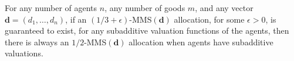 \begin{corollary}
    For any number of agents $n$, any number of goods $m$, and any vector $\boldsymbol{d}=(d_1,\ldots, d_n)$, if an $(1/3+\epsilon)$-MMS$(\boldsymbol{d})$ allocation, for some $\epsilon > 0$, is guaranteed to exist, for any subadditive valuation functions of the agents, then there is always an $1/2$-MMS$(\boldsymbol{d})$ allocation when agents have subadditive valuations.
\end{corollary}
    

